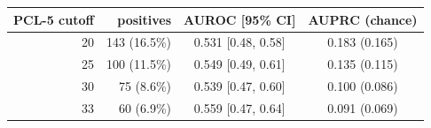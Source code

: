 \begin{tabular}{rrcc}
\toprule
PCL-5 cutoff & positives & AUROC [95\% CI] & AUPRC (chance) \\
\midrule
20 & 143 (16.5\%) & 0.531 [0.48, 0.58] & 0.183 (0.165) \\
25 & 100 (11.5\%) & 0.549 [0.49, 0.61] & 0.135 (0.115) \\
30 & 75 (8.6\%) & 0.539 [0.47, 0.60] & 0.100 (0.086) \\
33 & 60 (6.9\%) & 0.559 [0.47, 0.64] & 0.091 (0.069) \\
\bottomrule
\end{tabular}
